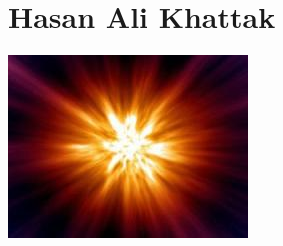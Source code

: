 \documentclass{article}
\begin{document}
\section*{Hasan Ali Khattak}

\begin{flushright}                 
\includegraphics[width=0.2\linewidth]{figs/bigBangPicture.png}
\end{flushright}








\end{document}

